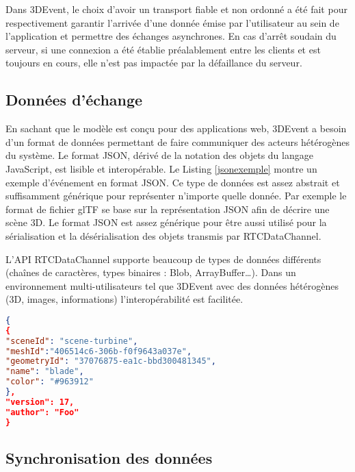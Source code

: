 Dans 3DEvent, le choix d'avoir un transport 
fiable et non ordonné a été fait pour respectivement 
garantir l'arrivée d'une donnée émise par l'utilisateur au sein de l'application et 
permettre des échanges asynchrones.
En cas d'arrêt soudain du serveur, si une connexion a été établie préalablement 
entre les clients et est toujours en cours, elle n'est pas impactée par la défaillance 
du serveur.

\subsection{Données d'échange}
En sachant que le modèle est conçu pour des applications web, 3DEvent a besoin 
d'un format de données permettant de faire communiquer des acteurs hétérogènes 
du système. Le format \gls{JSON}, dérivé de la notation des objets du langage 
JavaScript, est lisible et interopérable. Le Listing \ref{jsonexemple} montre un 
exemple d'événement en format JSON.
Ce type de données est assez abstrait et suffisamment générique pour 
représenter n'importe quelle donnée. Par exemple le format de fichier 
\gls{glTF} se base sur la représentation \gls{JSON} afin de 
décrire une scène \gls{3D}.
Le format \gls{JSON} est assez générique pour être aussi utilisé pour la sérialisation et la désérialisation des 
objets transmis par RTCDataChannel. 

L'\acrshort{API} RTCDataChannel supporte beaucoup de types de données 
différents (chaînes de caractères, types binaires : Blob, ArrayBuffer\dots). Dans 
un environnement multi-utilisateurs tel que 3DEvent avec des données hétérogènes (3D, images, 
informations) l'interopérabilité est facilitée.

\begin{lstlisting}[language=json,firstnumber=1,label=jsonexemple,caption=Mesh 
added to Scene event and parameters]
{
{
"sceneId": "scene-turbine",
"meshId":"406514c6-306b-f0f9643a037e",
"geometryId": "37076875-ea1c-bbd300481345",
"name": "blade",
"color": "#963912"
},
"version": 17,
"author": "Foo"
}
\end{lstlisting}

\subsection{Synchronisation des données}
